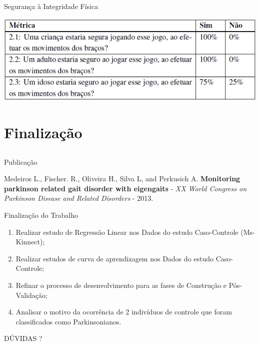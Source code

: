 \documentclass{beamer}
\begin{document}
\begin{frame}{Segurança à Integridade Física} 
    \begin{block}{}
			\center \includegraphics[height=1.4 in]{img/metricasq2.png}
    \end{block}
\end{frame}


\section{Finalização}
\subsection{}
\begin{frame}{Publicação}
\begin{block}{}
Medeiros L., Fischer. R., Oliveira H., Silva L, and Perkusich A. \textbf{Monitoring parkinson
related gait disorder with eigengaits} - \textit{XX World Congress on Parkinson Disease and Related Disorders} - 2013.
\end{block}
\end{frame}

\begin{frame}{Finalização do Trabalho}
\begin{enumerate}[<+->]
	\item Realizar estudo de Regressão Linear nos Dados do estudo Caso-Controle (Ms-Kinnect);
	\item Realizar estudos de curva de aprendizagem nos Dados do estudo Caso-Controle;
	\item Refinar o processo de desenvolvimento para as fases de Construção e Pós-Validação;
	\item Analisar o motivo da ocorrência de 2 indivíduos de controle que foram classificados como Parkinsonianos.
\end{enumerate}
\end{frame}


\begin{frame}
  \begin{center}
  DÚVIDAS ?
  \end{center}
\end{frame}


\end{document}
